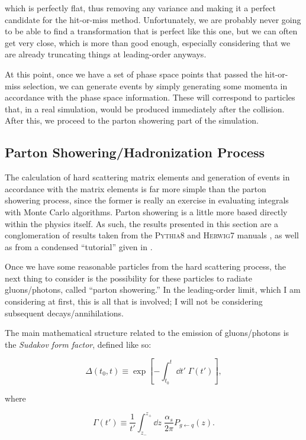 which is perfectly flat, thus removing any variance and making it a perfect candidate for the hit-or-miss method. Unfortunately, we are probably never going to be able to find a transformation that is perfect like this one, but we can often get very close, which is more than good enough, especially considering that we are already truncating things at leading-order anyways.

At this point, once we have a set of phase space points that passed the hit-or-miss selection, we can generate events by simply generating some momenta in accordance with the phase space information. These will correspond to particles that, in a real simulation, would be produced immediately after the collision. After this, we proceed to the parton showering part of the simulation.


\subsection{Parton Showering/Hadronization Process}

The calculation of hard scattering matrix elements and generation of events in accordance with the matrix elements is far more simple than the parton showering process, since the former is really an exercise in evaluating integrals with Monte Carlo algorithms. Parton showering is a little more based directly within the physics itself. As such, the results presented in this section are a conglomeration of results taken from the \textsc{Pythia8} and \textsc{Herwig7} manuals \cite{PYTHIA8DOC,HERWIGDOCS}, as well as from a condensed ``tutorial'' given in \cite{PYRESIAS}.

Once we have some reasonable particles from the hard scattering process, the next thing to consider is the possibility for these particles to radiate gluons/photons, called ``parton showering.'' In the leading-order limit, which I am considering at first, this is all that is involved; I will not be considering subsequent decays/annihilations.

The main mathematical structure related to the emission of gluons/photons is the \textit{Sudakov form factor}, defined like so:

\begin{equation}
  \Delta(t_0,t) \equiv \exp\left[ -\int_{t_0}^t \dd t' \; \Gamma(t') \right],
\end{equation}

where

\begin{equation}
  \Gamma(t') \equiv \frac{1}{t'} \int_{z_-}^{z_+} \dd z \; \frac{\alpha_s}{2\pi}P_{g \leftarrow q}(z).
\end{equation}

